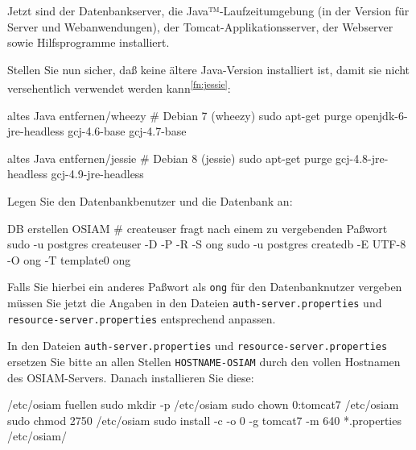 Jetzt sind der Datenbankserver, die Java™-Laufzeitumgebung (in der
Version für Server und Webanwendungen), der Tomcat-Applikationsserver,
der Webserver sowie Hilfsprogramme installiert.

\begin{minipage}{\textwidth}
Stellen Sie nun sicher, daß keine ältere Java-Version installiert
ist, damit sie nicht versehentlich verwendet werden kann\Hair\textsuperscript{\ref{fn:jessie}}:

\begin{lstdump}{altes Java entfernen/wheezy}
# Debian 7 (wheezy)
sudo apt-get purge openjdk-6-jre-headless gcj-4.6-base gcj-4.7-base
\end{lstdump}

\begin{lstdump}{altes Java entfernen/jessie}
# Debian 8 (jessie)
sudo apt-get purge gcj-4.8-jre-headless gcj-4.9-jre-headless
\end{lstdump}
\end{minipage}

\begin{minipage}{\textwidth}
Legen Sie den Datenbankbenutzer und die Datenbank an:

\begin{lstdump}{DB erstellen OSIAM}
# createuser fragt nach einem zu vergebenden Paßwort
sudo -u postgres createuser -D -P -R -S ong
sudo -u postgres createdb -E UTF-8 -O ong -T template0 ong
\end{lstdump}

Falls Sie hierbei ein anderes Paßwort als \texttt{ong} für
den Datenbanknutzer vergeben müssen Sie jetzt die Angaben
in den Dateien \texttt{auth-server.properties} und
\texttt{resource-server.properties} entsprechend anpassen.
\end{minipage}

\begin{minipage}{\textwidth}
In den Dateien \texttt{auth-server.properties} und
\texttt{resource-server.properties} ersetzen Sie bitte an allen
Stellen \texttt{HOSTNAME-OSIAM} durch den vollen Hostnamen des
OSIAM-Servers. Danach installieren Sie diese:

\begin{lstdump}{/etc/osiam fuellen}
sudo mkdir -p /etc/osiam
sudo chown 0:tomcat7 /etc/osiam
sudo chmod 2750 /etc/osiam
sudo install -c -o 0 -g tomcat7 -m 640 *.properties /etc/osiam/
\end{lstdump}
\end{minipage}

